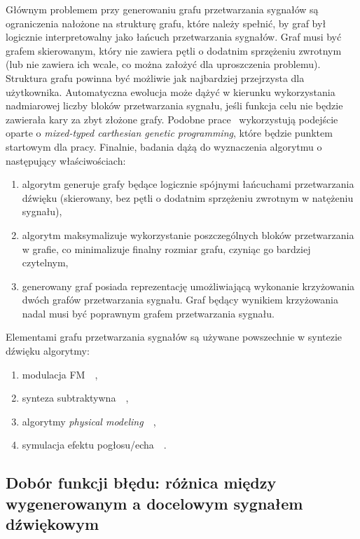 Głównym problemem przy generowaniu grafu przetwarzania sygnałów są ograniczenia nałożone na strukturę grafu,
które należy spełnić, by graf był logicznie interpretowalny jako łańcuch przetwarzania sygnałów.
Graf musi być grafem skierowanym, który nie zawiera pętli o dodatnim sprzężeniu zwrotnym 
(lub nie zawiera ich wcale, co można założyć dla uproszczenia problemu).
Struktura grafu powinna być możliwie jak najbardziej przejrzysta dla użytkownika. 
Automatyczna ewolucja może dążyć w kierunku wykorzystania nadmiarowej liczby
bloków przetwarzania sygnału, jeśli funkcja celu nie będzie zawierała kary za zbyt złożone grafy.
Podobne prace~\cite{evolutionary_puredata} wykorzystują podejście oparte o 
\textit{mixed-typed carthesian genetic programming}, które będzie punktem startowym dla pracy.
Finalnie, badania dążą do wyznaczenia algorytmu o następujący właściwościach:

\begin{enumerate}
    \item algorytm generuje grafy będące logicznie spójnymi łańcuchami przetwarzania dźwięku (skierowany, bez pętli o dodatnim sprzężeniu zwrotnym w natężeniu sygnału),
    \item algorytm maksymalizuje wykorzystanie poszczególnych bloków przetwarzania w grafie, co minimalizuje finalny rozmiar grafu, czyniąc go bardziej czytelnym,
    \item generowany graf posiada reprezentację umożliwiającą wykonanie krzyżowania dwóch grafów przetwarzania sygnału. Graf będący wynikiem krzyżowania nadal musi być poprawnym grafem przetwarzania sygnału.
\end{enumerate}

Elementami grafu przetwarzania sygnałów są używane powszechnie w syntezie dźwięku algorytmy:

\begin{enumerate}
  \item modulacja FM~\cite{spectral_audio_processing}~\cite{computational_music_synthesis},
  \item synteza subtraktywna~\cite{computational_music_synthesis}~\cite{digital_filters},
  \item algorytmy \textit{physical modeling}~\cite{lisp_synthesis}~\cite{computational_music_synthesis},
  \item symulacja efektu pogłosu/echa~\cite{reverb}~\cite{freeverb}.
\end{enumerate}

\subsection{Dobór funkcji błędu: różnica między wygenerowanym a docelowym sygnałem dźwiękowym}

